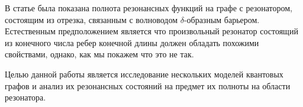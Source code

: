 В статье \cite{popov_exner70} была показана полнота резонансных функций на графе с резонатором, состоящим из отрезка, связанным с волноводом $\delta$-образным барьером. Естественным предположением является что произвольный резонатор состоящий из конечного числа ребер конечной длины должен обладать похожими свойствами, однако, как мы покажем что это не так. 

Целью данной работы является исследование нескольких моделей квантовых графов и анализ их резонансных состояний на предмет их полноты на области резонатора.

